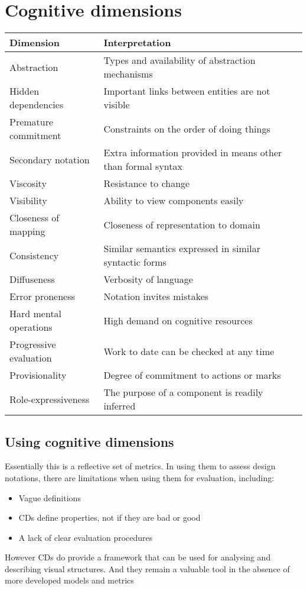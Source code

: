 \documentclass{article}[18pt]
\begin{document}
\section{Cognitive dimensions}
{\renewcommand{\arraystretch}{2}
\begin{tabularx}{\textwidth}{|X|X|}
\hline
\textbf{Dimension}& \textbf{Interpretation}\\
\hline
Abstraction& Types and availability of abstraction mechanisms\\
\hline
Hidden dependencies& Important links between entities are not visible\\
\hline
Premature commitment& Constraints on the order of doing things\\
\hline
Secondary notation& Extra information provided in means other than formal syntax\\
\hline
Viscosity& Resistance to change\\
\hline
Visibility& Ability to view components easily\\
\hline
Closeness of mapping& Closeness of representation to domain\\
\hline
Consistency&Similar semantics expressed in similar syntactic forms\\
\hline
Diffuseness& Verbosity of language\\
\hline
Error proneness & Notation invites mistakes\\
\hline
Hard mental operations& High demand on cognitive resources\\
\hline
Progressive evaluation & Work to date can be checked at any time\\
\hline
Provisionality& Degree of commitment to actions or marks\\
\hline
Role-expressiveness& The purpose of a component is readily inferred\\
\hline
\end{tabularx}
}
\subsection{Using cognitive dimensions}
Essentially this is a reflective set of metrics. In using them to assess design notations, there are limitations when using them for evaluation, including:
\begin{itemize}
	\item Vague definitions
	\item CDs define properties, not if they are bad or good
	\item A lack of clear evaluation procedures
\end{itemize}
However CDs do provide a framework that can be used for analysing and describing visual structures. And they remain a valuable tool in the absence of more developed models and metrics
\end{document}
